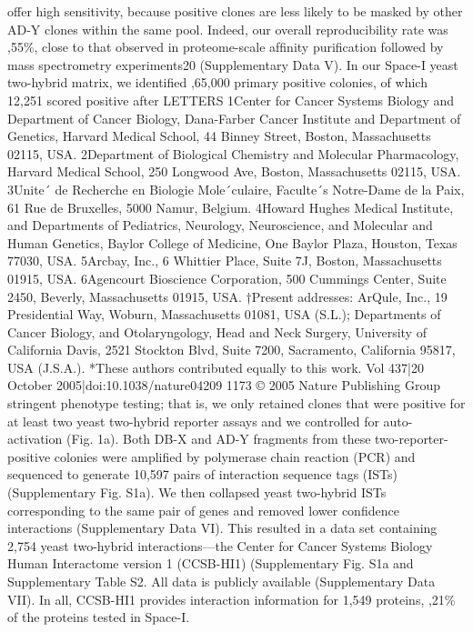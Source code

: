 offer high sensitivity, because positive clones are less likely to be
masked by other AD-Y clones within the same pool. Indeed, our
overall reproducibility rate was ,55\%, close to that observed in
proteome-scale afﬁnity puriﬁcation followed by mass spectrometry
experiments20 (Supplementary Data V).
In our Space-I yeast two-hybrid matrix, we identiﬁed ,65,000
primary positive colonies, of which 12,251 scored positive after
LETTERS
1Center for Cancer Systems Biology and Department of Cancer Biology, Dana-Farber Cancer Institute and Department of Genetics, Harvard Medical School, 44 Binney Street,
Boston, Massachusetts 02115, USA. 2Department of Biological Chemistry and Molecular Pharmacology, Harvard Medical School, 250 Longwood Ave, Boston, Massachusetts
02115, USA. 3Unite´ de Recherche en Biologie Mole´culaire, Faculte´s Notre-Dame de la Paix, 61 Rue de Bruxelles, 5000 Namur, Belgium. 4Howard Hughes Medical Institute, and
Departments of Pediatrics, Neurology, Neuroscience, and Molecular and Human Genetics, Baylor College of Medicine, One Baylor Plaza, Houston, Texas 77030, USA. 5Arcbay,
Inc., 6 Whittier Place, Suite 7J, Boston, Massachusetts 01915, USA. 6Agencourt Bioscience Corporation, 500 Cummings Center, Suite 2450, Beverly, Massachusetts 01915, USA.
†Present addresses: ArQule, Inc., 19 Presidential Way, Woburn, Massachusetts 01081, USA (S.L.); Departments of Cancer Biology, and Otolaryngology, Head and Neck Surgery,
University of California Davis, 2521 Stockton Blvd, Suite 7200, Sacramento, California 95817, USA (J.S.A.).
*These authors contributed equally to this work.
Vol 437|20 October 2005|doi:10.1038/nature04209
1173
© 2005 Nature Publishing Group
stringent phenotype testing; that is, we only retained clones that were
positive for at least two yeast two-hybrid reporter assays and we
controlled for auto-activation (Fig. 1a). Both DB-X and AD-Y
fragments from these two-reporter-positive colonies were ampliﬁed
by polymerase chain reaction (PCR) and sequenced to generate
10,597 pairs of interaction sequence tags (ISTs) (Supplementary
Fig. S1a). We then collapsed yeast two-hybrid ISTs corresponding
to the same pair of genes and removed lower conﬁdence interactions
(Supplementary Data VI). This resulted in a data set containing 2,754
yeast two-hybrid interactions—the Center for Cancer Systems
Biology Human Interactome version 1 (CCSB-HI1) (Supplementary
Fig. S1a and Supplementary Table S2. All data is publicly available
(Supplementary Data VII). In all, CCSB-HI1 provides interaction
information for 1,549 proteins, ,21\% of the proteins tested in
Space-I.
